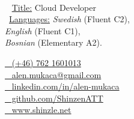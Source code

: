 \documentclass{modernsimplecv}
\begin{document}
\begin{minipage}[t]{0.8\textwidth}
\vspace{0pt} %
\begin{shaded*}

\begin{minipage}[t]{0.4\textwidth}
\vspace{0pt} %
{\par\centering\huge{}} \\[0.3cm]

{\small
\faGraduationCap~ \underline{Title:} Cloud Developer \\
\faCommentsO~\underline{Languages:} \emph{Swedish} (Fluent C2), \\ \emph{English} (Fluent C1), \\ \emph{Bosnian} (Elementary A2).}
\end{minipage}\hfill
\begin{minipage}[t]{0.55\textwidth}
\vspace{0pt} %
\href{tel:+46762160103}{\faPhone~ (+46) 762 1601013} \\
\href{mailto:alen.mukaca@gmail.com}{\faEnvelopeO~ \protect alen.mukaca@gmail.com} \\[0.1cm]

\href{https://linkedin.com/in/alen-mukaca/}{\faLinkedin~ \protect linkedin.com/in/alen-mukaca} \\
\href{https://github.com/ShinzenATT}{\faGithub~ \protect github.com/ShinzenATT} \\
\href{https://shinzle.net}{\faGlobe~ \protect www.shinzle.net}
\end{minipage}
\hfill
\end{shaded*}
\end{minipage}\\[5pt]



\subsection*{}
\vspace{-3em}
\end{document}
